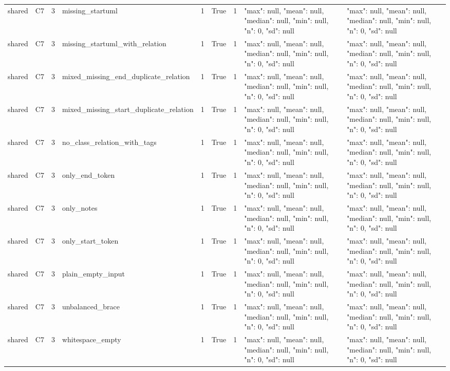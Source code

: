 \begin{tabular}{lllllllll}
shared & C7 & 3 & missing\_startuml & 1 & True & 1 & {"max": null, "mean": null, "median": null, "min": null, "n": 0, "sd": null} & {"max": null, "mean": null, "median": null, "min": null, "n": 0, "sd": null} \\
shared & C7 & 3 & missing\_startuml\_with\_relation & 1 & True & 1 & {"max": null, "mean": null, "median": null, "min": null, "n": 0, "sd": null} & {"max": null, "mean": null, "median": null, "min": null, "n": 0, "sd": null} \\
shared & C7 & 3 & mixed\_missing\_end\_duplicate\_relation & 1 & True & 1 & {"max": null, "mean": null, "median": null, "min": null, "n": 0, "sd": null} & {"max": null, "mean": null, "median": null, "min": null, "n": 0, "sd": null} \\
shared & C7 & 3 & mixed\_missing\_start\_duplicate\_relation & 1 & True & 1 & {"max": null, "mean": null, "median": null, "min": null, "n": 0, "sd": null} & {"max": null, "mean": null, "median": null, "min": null, "n": 0, "sd": null} \\
shared & C7 & 3 & no\_class\_relation\_with\_tags & 1 & True & 1 & {"max": null, "mean": null, "median": null, "min": null, "n": 0, "sd": null} & {"max": null, "mean": null, "median": null, "min": null, "n": 0, "sd": null} \\
shared & C7 & 3 & only\_end\_token & 1 & True & 1 & {"max": null, "mean": null, "median": null, "min": null, "n": 0, "sd": null} & {"max": null, "mean": null, "median": null, "min": null, "n": 0, "sd": null} \\
shared & C7 & 3 & only\_notes & 1 & True & 1 & {"max": null, "mean": null, "median": null, "min": null, "n": 0, "sd": null} & {"max": null, "mean": null, "median": null, "min": null, "n": 0, "sd": null} \\
shared & C7 & 3 & only\_start\_token & 1 & True & 1 & {"max": null, "mean": null, "median": null, "min": null, "n": 0, "sd": null} & {"max": null, "mean": null, "median": null, "min": null, "n": 0, "sd": null} \\
shared & C7 & 3 & plain\_empty\_input & 1 & True & 1 & {"max": null, "mean": null, "median": null, "min": null, "n": 0, "sd": null} & {"max": null, "mean": null, "median": null, "min": null, "n": 0, "sd": null} \\
shared & C7 & 3 & unbalanced\_brace & 1 & True & 1 & {"max": null, "mean": null, "median": null, "min": null, "n": 0, "sd": null} & {"max": null, "mean": null, "median": null, "min": null, "n": 0, "sd": null} \\
shared & C7 & 3 & whitespace\_empty & 1 & True & 1 & {"max": null, "mean": null, "median": null, "min": null, "n": 0, "sd": null} & {"max": null, "mean": null, "median": null, "min": null, "n": 0, "sd": null} \\

\end{tabular}
